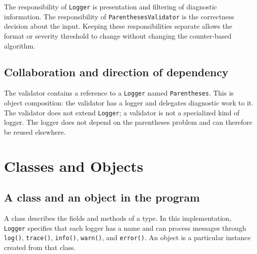 \documentclass[12pt,a4paper]{article}
\newcommand{\code}[1]{\texttt{#1}}
\begin{document}
The responsibility of \code{Logger} is presentation and filtering of diagnostic information. The responsibility of \code{ParenthesesValidator} is the correctness decision about the input. Keeping these responsibilities separate allows the format or severity threshold to change without changing the counter-based algorithm.

\subsection{Collaboration and direction of dependency}
\begin{center}
\end{center}
The validator contains a reference to a \code{Logger} named \code{Parentheses}. This is object composition: the validator has a logger and delegates diagnostic work to it. The validator does not extend \code{Logger}; a validator is not a specialized kind of logger. The logger does not depend on the parentheses problem and can therefore be reused elsewhere.

\section{Classes and Objects}
\subsection{A class and an object in the program}
A class describes the fields and methods of a type. In this implementation, \code{Logger} specifies that each logger has a name and can process messages through \code{log()}, \code{trace()}, \code{info()}, \code{warn()}, and \code{error()}. An object is a particular instance created from that class.
\end{document}
